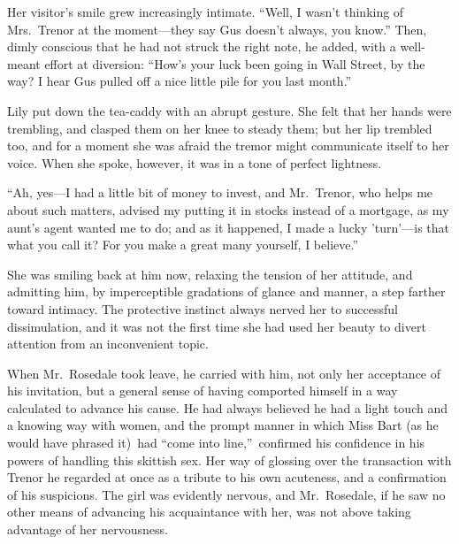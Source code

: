 \documentclass[12pt,a4paper]{book}
\begin{document}
Her visitor's smile grew increasingly intimate. ``Well, I wasn't
thinking of Mrs.\ Trenor at the moment---they say Gus doesn't
always, you know.'' Then, dimly conscious that he had not struck
the right note, he added, with a well-meant effort at diversion: 
``How's your luck been going in Wall Street, by the way? I hear
Gus pulled off a nice little pile for you last month.''





Lily put down the tea-caddy with an abrupt gesture. She felt that
her hands were trembling, and clasped them on her knee to steady
them; but her lip trembled too, and for a moment she was afraid
the tremor might communicate itself to her voice. When
she spoke, however, it was in a tone of perfect lightness.





``Ah, yes---I had a little bit of money to invest, and Mr.\ Trenor,
who helps me about such matters, advised my putting it in stocks
instead of a mortgage, as my aunt's agent wanted me to do; and as
it happened, I made a lucky 'turn'---is that what you call it? For
you make a great many yourself, I believe.''





She was smiling back at him now, relaxing the tension of her
attitude, and admitting him, by imperceptible gradations of
glance and manner, a step farther toward intimacy. The protective
instinct always nerved her to successful dissimulation, and it
was not the first time she had used her beauty to divert
attention from an inconvenient topic.





When Mr.\ Rosedale took leave, he carried with him, not only her
acceptance of his invitation, but a general sense of having
comported himself in a way calculated to advance his cause. He
had always believed he had a light touch and a knowing way with
women, and the prompt manner in which Miss Bart (as he would have
phrased it)\ had ``come into line,''\ confirmed his confidence in his
powers of handling this skittish sex. Her way of glossing over
the transaction with Trenor he regarded at once as a tribute to
his own acuteness, and a confirmation of his suspicions. The girl
was evidently nervous, and Mr.\ Rosedale, if he saw no other means
of advancing his acquaintance with her, was not above taking
advantage of her nervousness.
\end{document}

